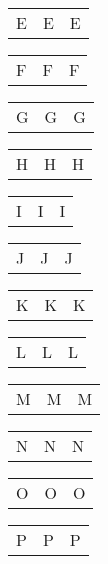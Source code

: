 \documentclass{minimal}
\begin{document}
\begin{longtable}{p{2.8cm}p{2.8cm}p{2.8cm}}
E & E & E
\end{longtable}

\begin{longtable}{p{2.8cm}p{2.8cm}p{2.8cm}}
F & F & F
\end{longtable}

\begin{longtable}{p{2.8cm}p{2.8cm}p{2.8cm}}
G & G & G
\end{longtable}

\begin{longtable}{p{2.8cm}p{2.8cm}p{2.8cm}}
H & H & H
\end{longtable}

\begin{longtable}{p{2.8cm}p{2.8cm}p{2.8cm}}
I & I & I
\end{longtable}

\begin{longtable}{p{2.8cm}p{2.8cm}p{2.8cm}}
J & J & J
\end{longtable}

\begin{longtable}{p{2.8cm}p{2.8cm}p{2.8cm}}
K & K & K
\end{longtable}

\begin{longtable}{p{2.8cm}p{2.8cm}p{2.8cm}}
L & L & L
\end{longtable}

\begin{longtable}{p{2.8cm}p{2.8cm}p{2.8cm}}
M & M & M
\end{longtable}

\begin{longtable}{p{2.8cm}p{2.8cm}p{2.8cm}}
N & N & N
\end{longtable}

\begin{longtable}{p{2.8cm}p{2.8cm}p{2.8cm}}
O & O & O
\end{longtable}

\begin{longtable}{p{2.8cm}p{2.8cm}p{2.8cm}}
P & P & P
\end{longtable}
\end{document}
